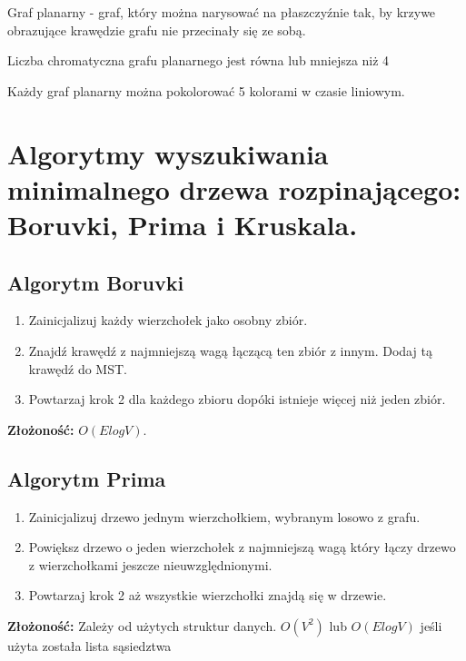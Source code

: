 \documentclass[12pt]{article}
\begin{document}
    \begin{definition}
        Graf planarny - graf, który można narysować na płaszczyźnie tak, by krzywe obrazujące krawędzie grafu nie przecinały się ze sobą.
    \end{definition}

    \begin{theorem}
        Liczba chromatyczna grafu planarnego jest równa lub mniejsza niż 4
    \end{theorem}

    Każdy graf planarny można pokolorować 5 kolorami w czasie liniowym.





    \newpage

    \section{Algorytmy wyszukiwania minimalnego drzewa rozpinającego: Boruvki, Prima i Kruskala.}

    \subsection{Algorytm Boruvki}
    \begin{enumerate}
        \item Zainicjalizuj każdy wierzchołek jako osobny zbiór.
        \item Znajdź krawędź z najmniejszą wagą łączącą ten zbiór z innym. Dodaj tą krawędź do MST.
        \item Powtarzaj krok 2 dla każdego zbioru dopóki istnieje więcej niż jeden zbiór.
    \end{enumerate}
    \textbf{Złożoność:} $O(ElogV)$.


    \subsection{Algorytm Prima}
    \begin{enumerate}
        \item Zainicjalizuj drzewo jednym wierzchołkiem, wybranym losowo z grafu.
        \item Powiększ drzewo o jeden wierzchołek z najmniejszą wagą który łączy drzewo z wierzchołkami jeszcze nieuwzględnionymi.
        \item Powtarzaj krok 2 aż wszystkie wierzchołki znajdą się w drzewie.
    \end{enumerate}
    \textbf{Złożoność:} Zależy od użytych struktur danych. $O(V^2)$ lub $O(ElogV)$ jeśli użyta została lista sąsiedztwa
\end{document}
